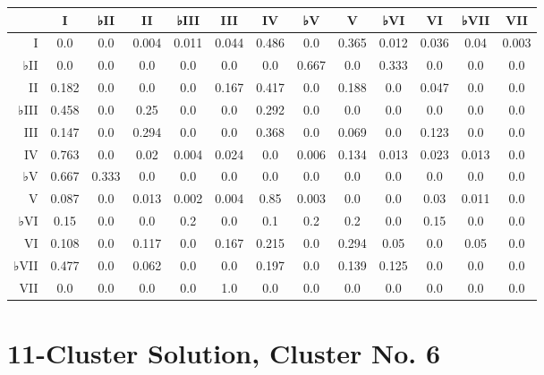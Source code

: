 \begin{table}[htbp]
\begin{minipage}{\linewidth}
\setlength{\tymax}{0.5\linewidth}
\centering
\small
\begin{tabulary}{\textwidth}{@{}RCCCCCCCCCCCC@{}} \toprule
&I&♭II&II&♭III&III&IV&♭V&V&♭VI&VI&♭VII&VII\\
\midrule
I&0.0&0.0&0.004&0.011&0.044&0.486&0.0&0.365&0.012&0.036&0.04&0.003\\
♭II&0.0&0.0&0.0&0.0&0.0&0.0&0.667&0.0&0.333&0.0&0.0&0.0\\
II&0.182&0.0&0.0&0.0&0.167&0.417&0.0&0.188&0.0&0.047&0.0&0.0\\
♭III&0.458&0.0&0.25&0.0&0.0&0.292&0.0&0.0&0.0&0.0&0.0&0.0\\
III&0.147&0.0&0.294&0.0&0.0&0.368&0.0&0.069&0.0&0.123&0.0&0.0\\
IV&0.763&0.0&0.02&0.004&0.024&0.0&0.006&0.134&0.013&0.023&0.013&0.0\\
♭V&0.667&0.333&0.0&0.0&0.0&0.0&0.0&0.0&0.0&0.0&0.0&0.0\\
V&0.087&0.0&0.013&0.002&0.004&0.85&0.003&0.0&0.0&0.03&0.011&0.0\\
♭VI&0.15&0.0&0.0&0.2&0.0&0.1&0.2&0.2&0.0&0.15&0.0&0.0\\
VI&0.108&0.0&0.117&0.0&0.167&0.215&0.0&0.294&0.05&0.0&0.05&0.0\\
♭VII&0.477&0.0&0.062&0.0&0.0&0.197&0.0&0.139&0.125&0.0&0.0&0.0\\
VII&0.0&0.0&0.0&0.0&1.0&0.0&0.0&0.0&0.0&0.0&0.0&0.0\\

\bottomrule

\end{tabulary}
\end{minipage}
\end{table}

\section{11-Cluster Solution, Cluster No. 6}
\label{11-clustersolutionclusterno.6}


